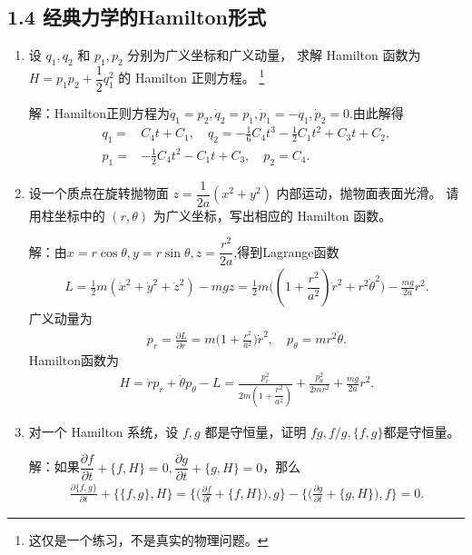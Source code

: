 \subsection{1.4 经典力学的Hamilton形式}
\begin{enumerate}
    \item 设 $q_1, q_2$ 和 $p_1, p_2$ 分别为广义坐标和广义动量，
    求解 Hamilton 函数为 $H=p_1p_2+\dfrac{1}{2}q_1^2$ 的 Hamilton 正则方程。
    \footnote{这仅是一个练习，不是真实的物理问题。}

    解：Hamilton正则方程为$\dot{q}_1=p_2, \dot{q}_2=p_1,\dot{p}_1=-q_1,\dot{p}_2=0$.由此解得
    \begin{align*}
        q_1=&C_4t+C_1,\quad q_2=-\frac{1}{6}C_4t^3-\frac{1}{2}C_1t^2+C_3t+C_2,\\
        p_1=&-\frac{1}{2}C_4t^2-C_1t+C_3, \quad p_2=C_4.
    \end{align*}

    \item 设一个质点在旋转抛物面 $z=\dfrac{1}{2a}(x^2+y^2)$ 内部运动，抛物面表面光滑。
    请用柱坐标中的 $(r, \theta)$ 为广义坐标，写出相应的 Hamilton 函数。

    解：由$x=r\cos\theta,y=r\sin\theta, z=\dfrac{r^2}{2a}$,得到Lagrange函数
    \begin{align*}
        L=\frac{1}{2}m(\dot{x}^2+\dot{y}^2+\dot{z}^2)-mgz=\frac{1}{2}m\Big((1
        +\dfrac{r^2}{a^2})\dot{r}^2+r^2\dot{\theta}^2\Big)-\frac{mg}{2a}r^2.
    \end{align*}
    广义动量为
    \begin{align*}
        p_r=\frac{\partial L}{\partial \dot{r}}=m\Big(1+\frac{r^2}{a^2}\Big)\dot{r}^2,
        \quad p_{\theta}=mr^2\dot{\theta}.
    \end{align*}
    Hamilton函数为
    \begin{align*}
        H=\dot{r}p_r+\dot{\theta}p_{\theta}-L=\frac{p_r^2}{2m(1+\dfrac{r^2}{a^2})}
        +\frac{p_{\theta}^2}{2mr^2}+\frac{mg}{2a}r^2.
    \end{align*}

    \item 对一个 Hamilton 系统，设 $f, g$ 都是守恒量，证明 $fg, f/g,\{f, g\}$都是守恒量。

    解：如果$\dfrac{\partial f}{\partial t}+\{f,H\}=0,\dfrac{\partial g}{\partial t}+\{g, H\}=0$，那么
    \begin{align}
        \frac{\partial\{f,g\}}{\partial t}+\{\{f,g\},H\}=\Big\{\Big(\frac{\partial f}{\partial t}+\{f,H\}\Big),g\Big\}
        -\Big\{\Big(\frac{\partial g}{\partial t}+\{g,H\}\Big),f\Big\}=0.
    \end{align}


\end{enumerate}
